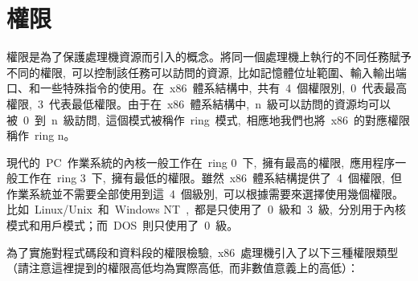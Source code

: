 \section{權限}


權限是為了保護處理機資源而引入的概念。將同一個處理機上執行的不同任務賦予不同的權限,~可以控制該任務可以訪問的資源,~比如記憶體位址範圍、輸入輸出端口、和一些特殊指令的使用。在~x86~體系結構中,~共有~4~個權限別,~0~代表最高權限,~3~代表最低權限。由于在~x86~體系結構中,~n~級可以訪問的資源均可以被~0~到~n~級訪問,~這個模式被稱作~ring~模式,~相應地我們也將~x86~的對應權限稱作~ring n。

現代的~PC~作業系統的內核一般工作在~ring 0~下,~擁有最高的權限,~應用程序一般工作在~ring 3~下,~擁有最低的權限。雖然~x86~體系結構提供了~4~個權限,~但作業系統並不需要全部使用到這~4~個級別,~可以根據需要來選擇使用幾個權限。比如~Linux/Unix~和~Windows NT~,~都是只使用了~0~級和~3~級,~分別用于內核模式和用戶模式；而~DOS~則只使用了~0~級。

為了實施對程式碼段和資料段的權限檢驗,~x86~處理機引入了以下三種權限類型（請注意這裡提到的權限高低均為實際高低,~而非數值意義上的高低）：

